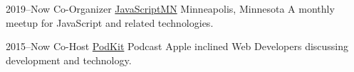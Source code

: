 \documentclass[]{cv-style} %
\begin{document}
\begin{entrylist}


\entry
{2019--Now}
{Co-Organizer {\normalfont \href{https://javascriptmn.com}{JavaScriptMN}}}
{Minneapolis, Minnesota}
{A monthly meetup for JavaScript and related technologies.}


\entry
{2015--Now}
{Co-Host {\normalfont \href{http://thenexus.tv/category/pk/}{PodKit}}}
{Podcast}
{Apple inclined Web Developers discussing development and technology.}


\end{entrylist}
\end{document}
